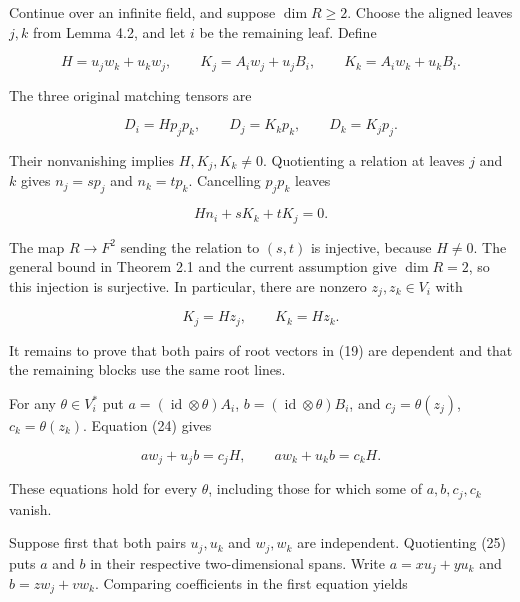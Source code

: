 \documentclass[11pt]{article}
\begin{document}
Continue over an infinite field, and suppose $\dim R\geq2$. Choose the aligned leaves $j,k$ from Lemma 4.2, and let $i$ be the remaining leaf. Define


\nopagebreak[4]

\begin{equation}
H=u_jw_k+u_kw_j,\qquad
K_j=A_iw_j+u_jB_i,\qquad
K_k=A_iw_k+u_kB_i.
\tag{21}
\end{equation}

The three original matching tensors are


\nopagebreak[4]

\begin{equation}
D_i=Hp_jp_k,\qquad D_j=K_kp_k,\qquad D_k=K_jp_j.
\tag{22}
\end{equation}

Their nonvanishing implies $H,K_j,K_k\ne0$. Quotienting a relation at leaves $j$ and $k$ gives $n_j=sp_j$ and $n_k=tp_k$. Cancelling $p_jp_k$ leaves


\nopagebreak[4]

\begin{equation}
Hn_i+sK_k+tK_j=0.
\tag{23}
\end{equation}

The map $R\to F^2$ sending the relation to $(s,t)$ is injective, because $H\ne0$. The general bound in Theorem 2.1 and the current assumption give $\dim R=2$, so this injection is surjective. In particular, there are nonzero $z_j,z_k\in V_i$ with


\nopagebreak[4]

\begin{equation}
K_j=Hz_j,\qquad K_k=Hz_k.
\tag{24}
\end{equation}

It remains to prove that both pairs of root vectors in (19) are dependent and that the remaining blocks use the same root lines.


For any $\theta\in V_i^*$ put $a=(\operatorname{id}\otimes\theta)A_i$, $b=(\operatorname{id}\otimes\theta)B_i$, and $c_j=\theta(z_j)$, $c_k=\theta(z_k)$. Equation (24) gives


\nopagebreak[4]

\begin{equation}
aw_j+u_jb=c_jH,\qquad aw_k+u_kb=c_kH.
\tag{25}
\end{equation}

These equations hold for every $\theta$, including those for which some of $a,b,c_j,c_k$ vanish.


Suppose first that both pairs $u_j,u_k$ and $w_j,w_k$ are independent. Quotienting (25) puts $a$ and $b$ in their respective two-dimensional spans. Write $a=xu_j+yu_k$ and $b=zw_j+vw_k$. Comparing coefficients in the first equation yields
\end{document}
